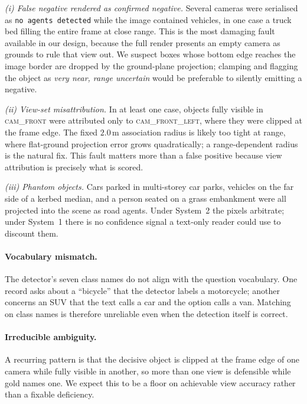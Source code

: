 \documentclass[11pt]{article}
\begin{document}
\textit{(i) False negative rendered as confirmed negative.} Several cameras
were serialised as \texttt{no agents detected} while the image contained
vehicles, in one case a truck bed filling the entire frame at close range.
This is the most damaging fault available in our design, because the full
render presents an empty camera as grounds to rule that view out. We suspect
boxes whose bottom edge reaches the image border are dropped by the
ground-plane projection; clamping and flagging the object as
\textit{very near, range uncertain} would be preferable to silently emitting a
negative.

\textit{(ii) View-set misattribution.} In at least one case, objects fully
visible in \textsc{cam\_front} were attributed only to
\textsc{cam\_front\_left}, where they were clipped at the frame edge. The
fixed $2.0$\,m association radius is likely too tight at range, where
flat-ground projection error grows quadratically; a range-dependent radius is
the natural fix. This fault matters more than a false positive because view
attribution is precisely what is scored.

\textit{(iii) Phantom objects.} Cars parked in multi-storey car parks, vehicles
on the far side of a kerbed median, and a person seated on a grass embankment
were all projected into the scene as road agents. Under System~2 the pixels
arbitrate; under System~1 there is no confidence signal a text-only reader
could use to discount them.

\paragraph{Vocabulary mismatch.} The detector's seven class names do not align
with the question vocabulary. One record asks about a ``bicycle'' that the
detector labels a motorcycle; another concerns an SUV that the text calls a car
and the option calls a van. Matching on class names is therefore unreliable
even when the detection itself is correct.

\paragraph{Irreducible ambiguity.} A recurring pattern is that the decisive
object is clipped at the frame edge of one camera while fully visible in
another, so more than one view is defensible while gold names one. We expect
this to be a floor on achievable view accuracy rather than a fixable
deficiency.
\end{document}
